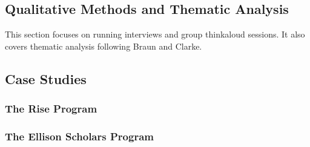 \subsection{Qualitative Methods and Thematic Analysis}
This section focuses on running interviews and group thinkaloud sessions. It also covers thematic analysis following Braun and Clarke.

\subsection{Case Studies}
\subsubsection{The Rise Program}
\subsubsection{The Ellison Scholars Program}


